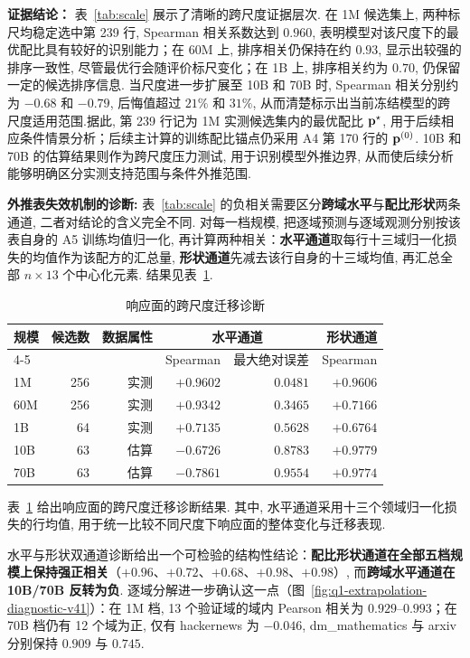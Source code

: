 \textbf{证据结论：} 表~\ref{tab:scale} 展示了清晰的跨尺度证据层次. 在 1M 候选集上,  两种标尺均稳定选中第 239 行,  Spearman 相关系数达到 $0.960$,  表明模型对该尺度下的最优配比具有较好的识别能力；在 60M 上,  排序相关仍保持在约 $0.93$,  显示出较强的排序一致性,  尽管最优行会随评价标尺变化；在 1B 上,  排序相关约为 $0.70$,  仍保留一定的候选排序信息. 当尺度进一步扩展至 10B 和 70B 时,  Spearman 相关分别约为 $-0.68$ 和 $-0.79$,  后悔值超过 $21\%$ 和 $31\%$,  从而清楚标示出当前冻结模型的跨尺度适用范围.据此,  第 239 行记为 1M 实测候选集内的最优配比 $\mathbf p^\star$,  用于后续相应条件情景分析；后续主计算的训练配比锚点仍采用 A4 第 170 行的 $\mathbf p^{(0)}$. 10B 和 70B 的估算结果则作为跨尺度压力测试,  用于识别模型外推边界,  从而使后续分析能够明确区分实测支持范围与条件外推范围.


\textbf{外推表失效机制的诊断:} 表~\ref{tab:scale} 的负相关需要区分\textbf{跨域水平}与\textbf{配比形状}两条通道, 二者对结论的含义完全不同. 对每一档规模, 把逐域预测与逐域观测分别按该表自身的 A5 训练均值归一化, 再计算两种相关：\textbf{水平通道}取每行十三域归一化损失的均值作为该配方的汇总量, \textbf{形状通道}先减去该行自身的十三域均值, 再汇总全部 $n\times13$ 个中心化元素. 结果见表~\ref{tab:q1-extrapolation-diagnostic-v41}. 

\begin{table}[H]\centering\small
\caption{响应面的跨尺度迁移诊断}
\label{tab:q1-extrapolation-diagnostic-v41}
\begin{tabular}{lrrrrr}\toprule
规模 & 候选数 & 数据属性 & \multicolumn{2}{c}{水平通道} & 形状通道 \\
\cmidrule(lr){4-5}
 & & & Spearman & 最大绝对误差 & Spearman \\\midrule
1M & 256 & 实测 & $+0.9602$ & $0.0481$ & $+0.9606$ \\
60M & 256 & 实测 & $+0.9342$ & $0.3465$ & $+0.7166$ \\
1B & 64 & 实测 & $+0.7135$ & $0.5628$ & $+0.6764$ \\
10B & 63 & 估算 & $-0.6726$ & $0.8783$ & $+0.9779$ \\
70B & 63 & 估算 & $-0.7861$ & $0.9554$ & $+0.9774$ \\\bottomrule
\end{tabular}\end{table}
表~\ref{tab:q1-extrapolation-diagnostic-v41} 给出响应面的跨尺度迁移诊断结果. 其中,  水平通道采用十三个领域归一化损失的行均值,  用于统一比较不同尺度下响应面的整体变化与迁移表现.

水平与形状双通道诊断给出一个可检验的结构性结论：\textbf{配比形状通道在全部五档规模上保持强正相关}（$+0.96$、$+0.72$、$+0.68$、$+0.98$、$+0.98$）, 而\textbf{跨域水平通道在 10B/70B 反转为负}. 逐域分解进一步确认这一点（图~\ref{fig:q1-extrapolation-diagnostic-v41}）：在 1M 档, 13 个验证域的域内 Pearson 相关为 $0.929$--$0.993$；在 70B 档仍有 12 个域为正, 仅有 hackernews 为 $-0.046$, dm\_mathematics 与 arxiv 分别保持 $0.909$ 与 $0.745$. 

